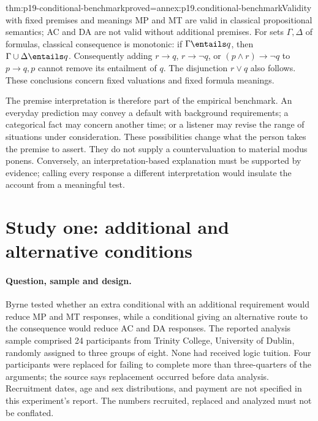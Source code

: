 \begin{hblemma}{thm:p19-conditional-benchmark}{proved=annex:p19.conditional-benchmark}{Validity with fixed premises and meanings}
MP and MT are valid in classical propositional semantics; AC and DA are
not valid without additional premises. For sets \(\Gamma,\Delta\) of formulas,
classical consequence is monotonic:
if \(\Gamma\entails q\), then \(\Gamma\cup\Delta\entails q\).
Consequently adding \(r\to q\), \(r\to\neg q\), or
\((p\land r)\to\neg q\) to \(p\to q,p\) cannot remove its entailment
of \(q\). The disjunction \(r\lor q\) also follows. These conclusions
concern fixed valuations and fixed formula meanings.
\end{hblemma}

The premise interpretation is therefore part of the empirical benchmark.
An everyday prediction may convey a default with background requirements;
a categorical fact may concern another time; or a listener may revise the
range of situations under consideration. These possibilities change what
the person takes the premise to assert. They do not supply a countervaluation
to material modus ponens. Conversely, an interpretation-based explanation
must be supported by evidence; calling every response a different
interpretation would insulate the account from a meaningful test.

\section{Study one: additional and alternative conditions}
\label{sec:p19-byrne-suppression-study}

\paragraph{Question, sample and design.}
Byrne tested whether an extra conditional with an additional requirement
would reduce MP and MT responses, while a conditional giving an alternative
route to the consequence would reduce AC and DA responses. The reported
analysis sample comprised 24 participants from Trinity College, University
of Dublin, randomly assigned to three groups of eight. None had received
logic tuition. Four participants were replaced for failing to complete more than
three-quarters of the arguments; the source says replacement occurred before
data analysis. Recruitment dates, age and sex distributions, and payment
are not specified in this experiment's report. The numbers recruited,
replaced and analyzed must not be conflated.

